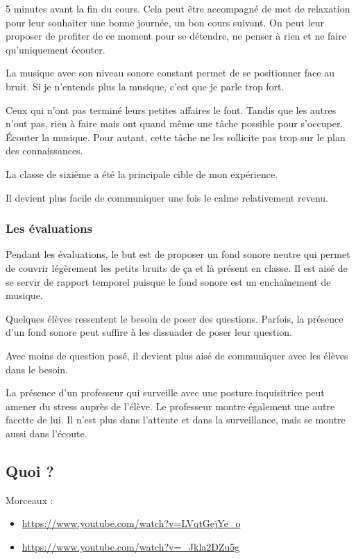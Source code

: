 \documentclass[11pt]{article}
\begin{document}
	5 minutes avant la fin du cours. Cela peut être accompagné de mot de relaxation pour leur souhaiter une bonne journée, un bon cours suivant. On peut leur proposer de profiter de ce moment pour se détendre, ne penser à rien et ne faire qu'uniquement écouter. 
	
	La musique avec son niveau sonore constant permet de se positionner face au bruit. Si je n’entends plus la musique, c'est que je parle trop fort.
	
	Ceux qui n'ont pas terminé leurs petites affaires le font. Tandis que les autres n'ont pas, rien à faire mais ont quand même une tâche possible pour s'occuper. Écouter la musique. Pour autant, cette tâche ne les sollicite pas trop sur le plan des connaissances.
	
	La classe de sixième a été la principale cible de mon expérience. 
	
	Il devient plus facile de communiquer une fois le calme relativement revenu. 
	
	\subsubsection{Les évaluations}
	
	Pendant les évaluations, le but est de proposer un fond sonore neutre qui permet de couvrir légèrement les petits bruits de ça et là présent en classe. Il est aisé de se servir de rapport temporel puisque le fond sonore est un enchaînement de musique. 
	
	Quelques élèves ressentent le besoin de poser des questions. Parfois, la présence d'un fond sonore peut suffire à les dissuader de poser leur question.
	
	Avec moins de question posé, il devient plus aisé de communiquer avec les élèves dans le besoin.
	
	La présence d'un professeur qui surveille avec une posture inquisitrice peut amener du stress auprès de l'élève. Le professeur montre également une autre facette de lui. Il n'est plus dans l'attente et dans la surveillance, mais se montre aussi dans l'écoute.
	
	\subsection{Quoi ?}
	
	Morceaux : 
	
	\begin{itemize}
	\item \url{https://www.youtube.com/watch?v=LVqtGejYe_o}
	\item \url{https://www.youtube.com/watch?v=_Jkla2DZu5g}
	\end{itemize}
	
\end{document}
